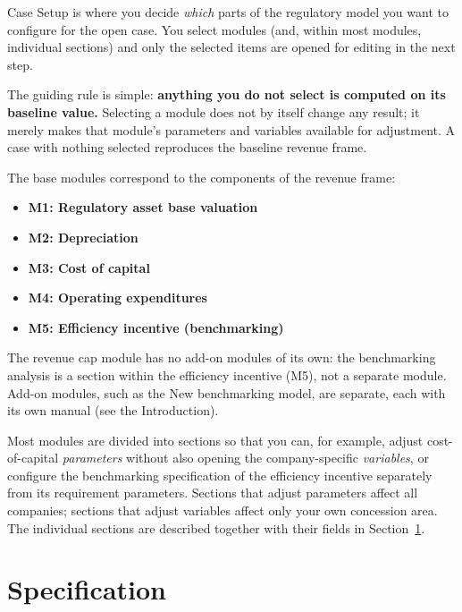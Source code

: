 Case Setup is where you decide \emph{which} parts of the regulatory model you want to configure for the open case. You select modules (and, within most modules, individual sections) and only the selected items are opened for editing in the next step.

The guiding rule is simple: \textbf{anything you do not select is computed on its baseline value.} Selecting a module does not by itself change any result; it merely makes that module's parameters and variables available for adjustment. A case with nothing selected reproduces the baseline revenue frame.

The base modules correspond to the components of the revenue frame:

\begin{itemize}
  \item \textbf{M1: Regulatory asset base valuation}
  \item \textbf{M2: Depreciation}
  \item \textbf{M3: Cost of capital}
  \item \textbf{M4: Operating expenditures}
  \item \textbf{M5: Efficiency incentive (benchmarking)}
\end{itemize}

\noindent The revenue cap module has no add-on modules of its own: the benchmarking analysis is a section within the efficiency incentive (M5), not a separate module. Add-on modules, such as the New benchmarking model, are separate, each with its own manual (see the Introduction).

Most modules are divided into sections so that you can, for example, adjust cost-of-capital \emph{parameters} without also opening the company-specific \emph{variables}, or configure the benchmarking specification of the efficiency incentive separately from its requirement parameters. Sections that adjust parameters affect all companies; sections that adjust variables affect only your own concession area. The individual sections are described together with their fields in Section~\ref{sec:page-spec}.


\section{Specification}
\label{sec:page-spec}

